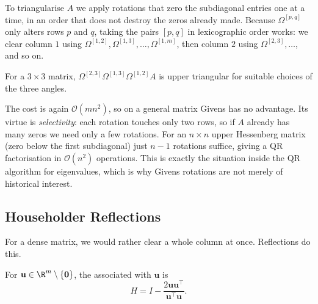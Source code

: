 To triangularise $A$ we apply rotations that zero the subdiagonal entries one at a time, in an order that does not destroy the zeros already made. Because $\Omega^{[p,q]}$ only alters rows $p$ and $q$, taking the pairs $[p,q]$ in lexicographic order works: we clear column $1$ using $\Omega^{[1,2]}, \Omega^{[1,3]}, \dots, \Omega^{[1,m]}$, then column $2$ using $\Omega^{[2,3]}, \dots$, and so on.

\begin{example}
  For a $3\times 3$ matrix, $\Omega^{[2,3]}\Omega^{[1,3]}\Omega^{[1,2]}A$ is upper triangular for suitable choices of the three angles.
\end{example}

The cost is again $\mathcal{O}(mn^2)$, so on a general matrix Givens has no advantage. Its virtue is \emph{selectivity}: each rotation touches only two rows, so if $A$ already has many zeros we need only a few rotations. For an $n\times n$ upper Hessenberg matrix (zero below the first subdiagonal) just $n-1$ rotations suffice, giving a QR factorisation in $\mathcal{O}(n^2)$ operations. This is exactly the situation inside the QR algorithm for eigenvalues, which is why Givens rotations are not merely of historical interest.

\subsection{Householder Reflections}

For a dense matrix, we would rather clear a whole column at once. Reflections do this.

\begin{definition}
  For $\mathbf{u}\in\R^m\setminus\{\mathbf{0}\}$, the  associated with $\mathbf{u}$ is
  $$
  H = I - \frac{2\mathbf{u}\mathbf{u}^\top}{\mathbf{u}^\top\mathbf{u}}.
  $$
\end{definition}

